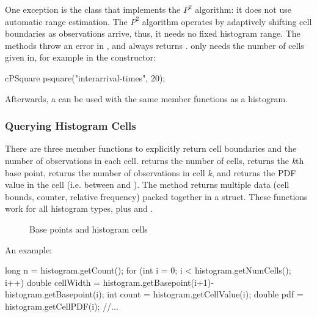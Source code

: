 One exception is the  class that implements the $P^{2}$
algorithm: it does not use automatic range estimation. The $P^{2}$
algorithm operates by adaptively shifting cell boundaries as observations
arrive, thus, it needs no fixed histogram range. The 
methods throw an error in , and 
always returns .  only needs the number of cells
given in, for example in the constructor:

\begin{cpp}
cPSquare psquare("interarrival-times", 20);
\end{cpp}

Afterwards, a  can be used with the same member functions
as a histogram.


\subsubsection{Querying Histogram Cells}
\label{sec:sim-lib:querying-histogram-cells}

There are three member functions to explicitly return cell boundaries
and the number of observations in each cell.  returns
the number of cells,  returns the
\textit{k}th base point,  returns the
number of observations in cell \textit{k}, and
 returns the PDF value in the cell
(i.e. between  and
).
The  method returns multiple data
(cell bounds, counter, relative frequency) packed together in a struct.
These functions work for all histogram types, plus 
and .

\begin{figure}[htbp]
  \begin{center}
    
    \caption{Base points and histogram cells}
  \end{center}
\end{figure}

An example:

\begin{cpp}
long n = histogram.getCount();
for (int i = 0; i < histogram.getNumCells(); i++) {
  double cellWidth = histogram.getBasepoint(i+1)-histogram.getBasepoint(i);
  int count = histogram.getCellValue(i);
  double pdf = histogram.getCellPDF(i);
  //...
}
\end{cpp}


